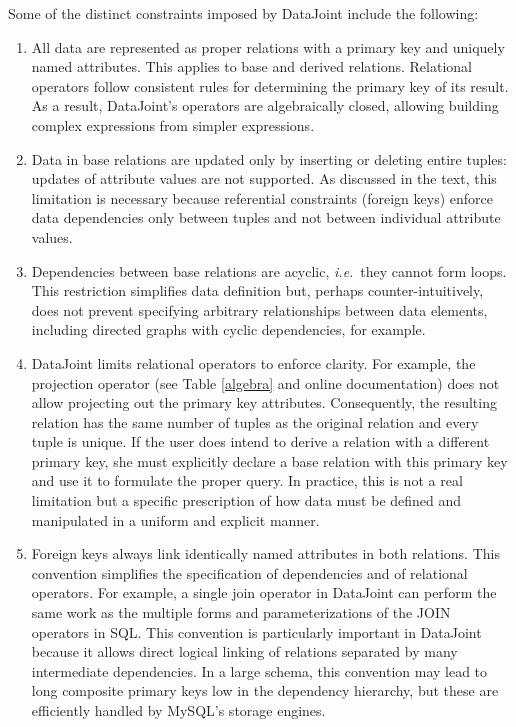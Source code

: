 Some of the distinct constraints imposed by DataJoint include the following:
\begin{enumerate}

\item
All data are represented as proper relations with a primary key and uniquely named attributes. 
This applies to base and derived relations. 
Relational operators follow consistent rules for determining the primary key of its result. 
As a result, DataJoint's operators are algebraically closed, allowing building complex expressions from simpler expressions.

\item
Data in base relations are updated only by inserting or deleting entire tuples: updates of attribute values are not supported.
As discussed in the text, this limitation is necessary because referential constraints (foreign keys) enforce data dependencies only between tuples and not between individual attribute values. 

\item 
Dependencies between base relations are acyclic, \emph{i.e.}\ they cannot form loops. 
This restriction simplifies data definition but, perhaps counter-intuitively, does not prevent specifying arbitrary relationships between data elements, including directed graphs with cyclic dependencies, for example.

\item
DataJoint limits relational operators to enforce clarity.
For example, the projection operator (see Table \ref{algebra} and online documentation) does not allow projecting out the primary key attributes.
Consequently, the resulting relation has the same number of tuples as the original relation and every tuple is unique.
If the user does intend to derive a relation with a different primary key, she must explicitly declare a base relation with this primary key and use it to formulate the proper query.
In practice, this is not a real limitation but a specific prescription of how data must be defined and manipulated in a uniform and explicit manner.

\item
Foreign keys always link identically named attributes in both relations.
This convention simplifies the specification of dependencies and of relational operators.
For example, a single join operator in DataJoint can perform the same work as the multiple forms and parameterizations of the JOIN operators in SQL.
This convention is particularly important in DataJoint because it allows direct logical linking of relations separated by many intermediate dependencies.
In a large schema, this convention may lead to long composite primary keys low in the dependency hierarchy, but these are efficiently handled by MySQL's storage engines.

\end{enumerate}

